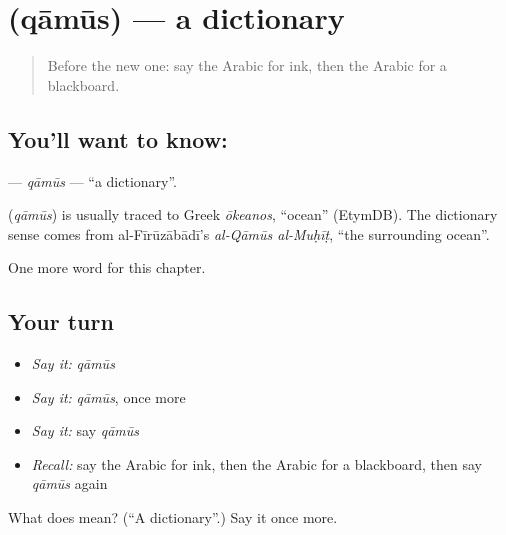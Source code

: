 \section[\texorpdfstring{\ar{قاموس} (qāmūs)}{قاموس (qāmūs)}]{ (qāmūs) — a dictionary}

\label{lesson:AR-C274-qamus}



\begin{quote}
Before the new one: say the Arabic for ink, then the Arabic for a blackboard.
\end{quote}

\subsection*{You'll want to know: }
\textbf{} — \emph{qāmūs} — \textquotedblleft{}a dictionary\textquotedblright{}.

\begin{cousinweb}
\textbf{} (\emph{qāmūs}) is usually traced to Greek \emph{ōkeanos}, \textquotedblleft{}ocean\textquotedblright{} (EtymDB). The dictionary sense comes from al-Fīrūzābādī's \emph{al-Qāmūs al-Muḥīṭ}, \textquotedblleft{}the surrounding ocean\textquotedblright{}.
\end{cousinweb}

\begin{grammarlens}[title={What you've built}]
One more word for this chapter.
\end{grammarlens}

\subsection*{Your turn}
\begin{itemize}
\raggedright
  \item \emph{Say it:} \emph{qāmūs}
  \item \emph{Say it:} \emph{qāmūs}, once more
  \item \emph{Say it:} say \emph{qāmūs}
  \item \emph{Recall:} say the Arabic for ink, then the Arabic for a blackboard, then say \emph{qāmūs} again
\end{itemize}

\begin{tcolorbox}[breakable,colback=teal!4,colframe=teal!35!black,title={Before you move on}]
What does  mean? (\textquotedblleft{}A dictionary\textquotedblright{}.) Say it once more.
\end{tcolorbox}
